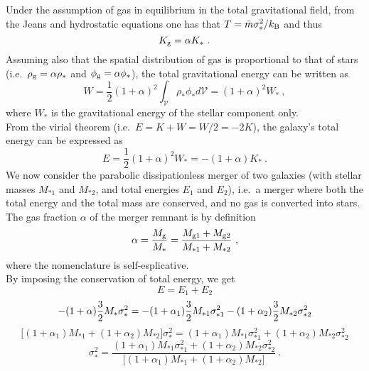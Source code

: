 Under the assumption of gas in equilibrium in the total gravitational field, 
from the Jeans and hydrostatic equations one has that $T = \bar{m} \sigma_*^2 / k_{\rm B}$ and thus 
\begin{equation}
K_{\rm g} = \alpha K_* \ .
\end{equation}
Assuming also that the spatial distribution of gas is proportional to that of stars (i.e.~$\rho_{\rm g} = \alpha \rho_*$ 
and $\phi_{\rm g} = \alpha \phi_*$), 
the total gravitational energy can be written as 
\begin{equation}
W = \frac{1}{2} (1+\alpha)^2 \int_{\mathcal{V}} \rho_* \phi_* d\mathcal{V} = (1+\alpha)^2 W_* \ ,
\end{equation}
where $W_*$ is the gravitational energy of the stellar component only. \\
From the virial theorem (i.e.~$E = K+W = W/2 = -2K$), the galaxy's total energy can be expressed as 
\begin{equation}
E = \frac{1}{2} (1+\alpha)^2 W_* = - (1+\alpha) K_* \ .
\end{equation}
We now consider the parabolic dissipationless merger of two galaxies (with stellar masses $M_{*1}$ and $M_{*2}$,
and total energies $E_1$ and $E_2$), 
i.e.~a merger where both the total energy and the total mass are conserved, 
and no gas is converted into stars. \\
The gas fraction $\alpha$ of the merger remnant is by definition
\begin{equation}
\alpha = \frac{M_{\rm g}}{M_*} = \frac{M_{\rm g1} + M_{\rm g2}}{M_{*1}+M_{*2}} \ ,
\end{equation}
where the nomenclature is self-esplicative. \\
By imposing the conservation of total energy, we get 
\begin{equation*}
E = E_1 + E_2 
\end{equation*}
\begin{equation*}
-(1+\alpha) \frac{3}{2} M_* \sigma_*^2 = -(1+\alpha_1) \frac{3}{2} M_{*1} \sigma_{*1}^2 -(1+\alpha_2) \frac{3}{2} M_{*2} \sigma_{*2}^2 \\
\end{equation*}
\begin{equation*}
\bigl[ (1+\alpha_1)M_{*1} + (1+\alpha_2)M_{*2} \bigr ] \sigma_*^2 = (1+\alpha_1)M_{*1}\sigma_{*1}^2 + (1+\alpha_2)M_{*2}\sigma_{*2}^2
\end{equation*}
\begin{equation}
\sigma_*^2 = \frac{(1+\alpha_1)M_{*1}\sigma_{*1}^2 + (1+\alpha_2)M_{*2}\sigma_{*2}^2}{\bigl[ (1+\alpha_1)M_{*1} + (1+\alpha_2)M_{*2} \bigr ]} \ .
\label{eq:sigma*2}
\end{equation}
